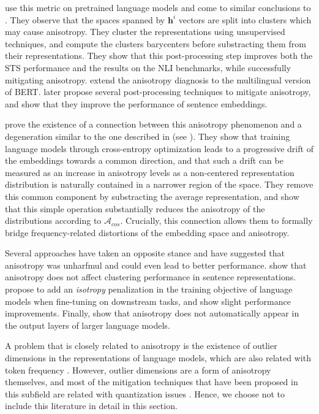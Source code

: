 \citet{rajaee-pilehvar-2021-cluster} use this metric on pretrained language models and come to similar conclusions to \citet{ethayarajh-2019-contextual}. They observe that the spaces spanned by $\mathbf{h}^i$ vectors are split into clusters which may cause anisotropy. They cluster the representations using unsupervised techniques, and compute the clusters barycenters before substracting them from their representations. They show that this post-processing step improves both the STS performance and the results on the NLI benchmarks, while successfully mitigating anisotropy. \citet{rajaee-pilehvar-2022-isotropy} extend the anisotropy diagnosis to the multilingual version of BERT. \citet{haemmerl-etal-2023-exploring} later propose several post-processing techniques to mitigate anisotropy, and show that they improve the performance of sentence embeddings.

\citet{bis-etal-2021-much} prove the existence of a connection between this anisotropy phenomenon and a degeneration similar to the one described in \citet{gao2018representation} (see ). They show that training language models through cross-entropy optimization leads to a progressive drift of the embeddings towards a common direction, and that such a drift can be measured as an increase in anisotropy levels as a non-centered representation distribution is naturally contained in a narrower region of the space. They remove this common component by substracting the average representation, and show that this simple operation substantially reduces the anisotropy of the distributions according to $\mathcal{A}_{cos}$. Crucially, this connection allows them to formally bridge frequency-related distortions of the embedding space and anisotropy.

Several approaches have taken an opposite stance and have suggested that anisotropy was unharfmul and could even lead to better performance. \citet{ait-saada-nadif-2023-anisotropy} show that anisotropy does not affect clustering performance in sentence representations. \citet{rudman2024stable} propose to add an \textit{isotropy} penalization in the training objective of language models when fine-tuning on downstream tasks, and show slight performance improvements. Finally, \citet{machina-mercer-2024-anisotropy} show that anisotropy does not automatically appear in the output layers of larger language models.


A problem that is closely related to anisotropy is the existence of outlier dimensions in the representations of language models, which are also related with token frequency \citep{puccetti-etal-2022-outlier}. However, outlier dimensions are a form of anisotropy themselves, and most of the mitigation techniques that have been proposed in this subfield are related with quantization issues \citep{ahmadian2023intriguing,nrusimha2024mitigatingimpactoutlierchannels}. Hence, we choose not to include this literature in detail in this section.


